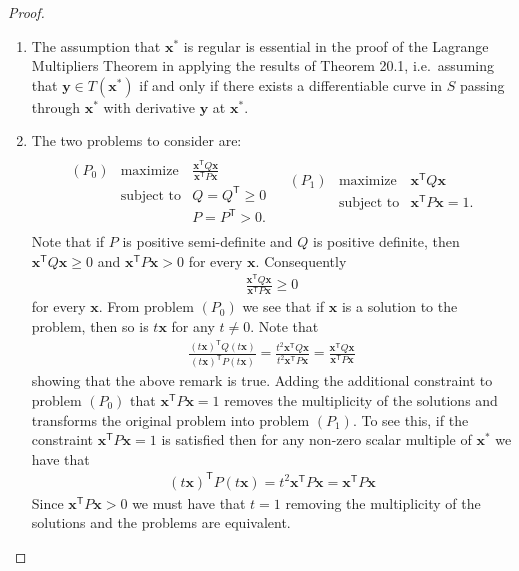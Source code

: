 \documentclass[12pt]{article}
\theoremstyle{definition}
\newcommand{\vc}[1]{\boldsymbol{#1}}
\newcommand{\tran}{\mathsf{T}}
\begin{document}
\begin{proof}
  \begin{enumerate}
    \item The assumption that $\vc{x}^*$ is regular is essential in  the proof of the Lagrange Multipliers Theorem
      in applying the results of Theorem 20.1, i.e.\ assuming that $\vc{y}\in T(\vc{x}^*)$ if and only if
      there exists a differentiable curve in $S$ passing through $\vc{x}^*$
      with derivative $\vc{y}$ at $\vc{x}^*$.
    \item The two problems to consider are:
      \begin{align*}
        \begin{array}{ll}
          \begin{array}{rrl}
            (P_0) & \text{maximize} & \frac{\vc{x}^\tran Q \vc{x}}{\vc{x}^\tran P \vc{x}}\\
            & \text{subject to} & Q = Q^\tran \geq 0 \\
            & & P = P^\tran > 0.
          \end{array}
          &
          \begin{array}{rrl}
            (P_1) & \text{maximize} & \vc{x}^\tran Q \vc{x}\\
            & \text{subject to} & \vc{x}^\tran P \vc{x} = 1.
          \end{array}
        \end{array}
      \end{align*}
      Note that if $P$ is positive semi-definite and $Q$ is positive definite, then
      $\vc{x}^\tran Q \vc{x} \geq 0$ and $\vc{x}^\tran P \vc{x} > 0$ for every $\vc{x}$. Consequently
      \begin{align*}
        \frac{\vc{x}^\tran Q \vc{x}}{\vc{x}^\tran P \vc{x}} \geq 0
      \end{align*}
      for every $\vc{x}$. From problem $(P_0)$ we see that if $\vc{x}$ is a solution to the problem,
      then so is $t\vc{x}$ for any $t \neq 0$. Note that
      \begin{align*}
        \frac{(t\vc{x})^\tran Q (t\vc{x})}{(t\vc{x})^\tran P (t\vc{x})} = \frac{t^2 \vc{x}^\tran Q \vc{x}}{t^2 \vc{x}^\tran P \vc{x}} = \frac{\vc{x}^\tran Q \vc{x}}{\vc{x}^\tran P \vc{x}}
      \end{align*}
      showing that the above remark is true. Adding the additional constraint to problem $(P_0)$ that $\vc{x}^\tran P \vc{x} = 1$ removes the multiplicity of the solutions and transforms
      the original problem into problem $(P_1)$. To see this, if the constraint $\vc{x}^\tran P \vc{x} = 1$
      is satisfied then for any non-zero scalar multiple of $\vc{x}^*$ we have that
      \begin{align*}
        (t\vc{x})^\tran P (t\vc{x}) = t^2 \vc{x}^\tran P\vc{x} = \vc{x}^\tran P\vc{x}
      \end{align*}
      Since $\vc{x}^\tran P\vc{x} > 0$ we must have that $t=1$ removing the multiplicity of the solutions
      and the problems are equivalent.


\end{enumerate}
\end{proof}
\end{document}
